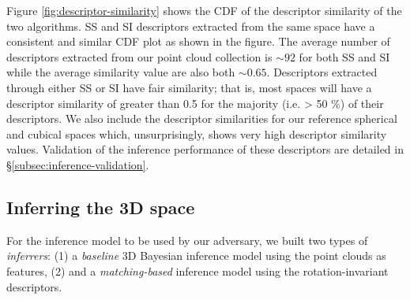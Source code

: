 Figure \ref{fig:descriptor-similarity} shows the CDF of the descriptor similarity of the two algorithms. SS and SI descriptors extracted from the same space have a consistent and similar CDF plot as shown in the figure. The average number of descriptors extracted from our point cloud collection is $\sim 92$ for both SS and SI while the average similarity value are also both $\sim 0.65$. Descriptors extracted through either SS or SI have fair similarity; that is, most spaces will have a descriptor similarity of greater than 0.5 for the majority (i.e. > 50 \%) of their descriptors. We also include the descriptor similarities for our reference spherical and cubical spaces which, unsurprisingly, shows very high descriptor similarity values.
Validation of the inference performance of these descriptors are detailed in \S\ref{subsec:inference-validation}.

\subsection{Inferring the 3D space}\label{subsec:inference}

For the inference model to be used by our adversary, we built two types of \textit{inferrers}: (1) a \textit{baseline} 3D Bayesian inference model using the point clouds as features, (2) and a \textit{matching-based} inference model using the rotation-invariant descriptors.

